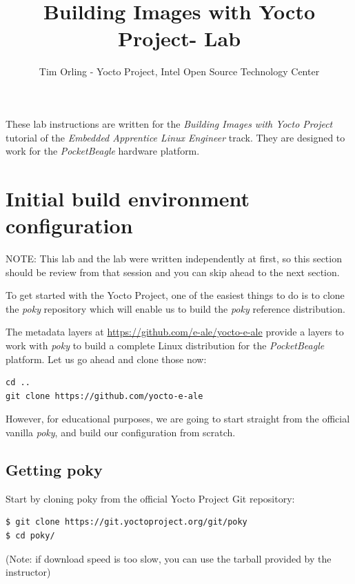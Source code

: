 \documentclass[a4paper,12pt,obeyspaces,spaces,hyphens]{article}
\title{Building Images with Yocto Project- Lab}
\author{Tim Orling - Yocto Project, Intel Open Source Technology Center}
\newcommand{\code}[1]
{\path{#1}}
\begin{document}
\maketitle
\thispagestyle{fancy}

These lab instructions are written for the {\em Building Images with Yocto Project} tutorial of the {\em Embedded Apprentice Linux Engineer}
track. They are designed to work for the {\em PocketBeagle} hardware
platform.

\section{Initial build environment configuration}
\begin{tcolorbox}[enhanced jigsaw,colback=notes,boxrule=0pt,arc=0pt]
NOTE: This lab and the \code{yocto-intro} lab were written independently at first, so this section should be review from that session and you can skip ahead to the next section.
\end{tcolorbox}

To get started with the Yocto Project, one of the easiest things to do is to clone the {\em poky} repository which will enable us to build the {\em poky} reference distribution.

The metadata layers at \url{https://github.com/e-ale/yocto-e-ale}
provide a layers to work with {\em poky} to build a complete Linux distribution for the {\em PocketBeagle}
platform. Let us go ahead and clone those now:

\begin{verbatim}
cd ..
git clone https://github.com/yocto-e-ale
\end{verbatim}

However, for educational purposes, we are going to start
straight from the official vanilla {\em poky}, and build our
configuration from scratch.

\subsection{Getting poky}

Start by cloning poky from the official Yocto Project Git repository:

\begin{verbatim}
$ git clone https://git.yoctoproject.org/git/poky
$ cd poky/
\end{verbatim}

(Note: if download speed is too slow, you can use the
\code{poky.tar.xz} tarball provided by the instructor)
\end{document}
